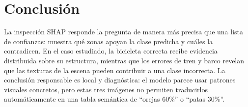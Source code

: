 \documentclass[11pt,a4paper]{article}
\begin{document}
\section{Conclusión}

La inspección SHAP responde la pregunta de manera más precisa que una lista
de confianzas: muestra qué zonas apoyan la clase predicha y cuáles la
contradicen. En el caso estudiado, la bicicleta correcta recibe evidencia
distribuida sobre su estructura, mientras que los errores de tren y barco
revelan que las texturas de la escena pueden contribuir a una clase incorrecta.
La conclusión responsable es local y diagnóstica: el modelo parece usar
patrones visuales concretos, pero estas tres imágenes no permiten traducirlos
automáticamente en una tabla semántica de “orejas 60\%” o “patas 30\%”.



\end{document}

